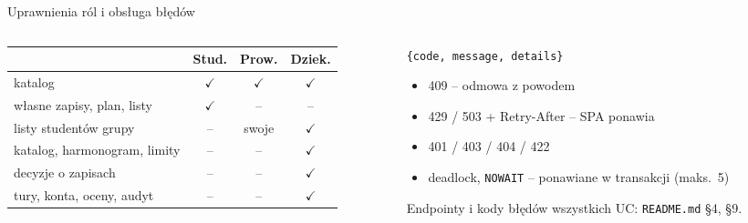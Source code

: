 \documentclass[aspectratio=169,11pt]{beamer}
\newcommand{\good}[1]{\textcolor{ok}{#1}}
\begin{document}
\begin{frame}{Uprawnienia ról i obsługa błędów}
  \begin{columns}[T]
    \begin{column}{0.5\textwidth}
      \footnotesize
      \begin{tabular}{@{}lccc@{}}
        \toprule
        & \textbf{Stud.} & \textbf{Prow.} & \textbf{Dziek.} \\
        \midrule
        katalog & \good{$\checkmark$} & \good{$\checkmark$} & \good{$\checkmark$} \\
        własne zapisy, plan, listy & \good{$\checkmark$} & -- & -- \\
        listy studentów grupy & -- & swoje & \good{$\checkmark$} \\
        katalog, harmonogram, limity & -- & -- & \good{$\checkmark$} \\
        decyzje o zapisach & -- & -- & \good{$\checkmark$} \\
        tury, konta, oceny, audyt & -- & -- & \good{$\checkmark$} \\
        \bottomrule
      \end{tabular}
    \end{column}
    \begin{column}{0.46\textwidth}
      \footnotesize
      \texttt{\{code, message, details\}}
      \begin{itemize}
        \item 409 -- odmowa z powodem
        \item 429 / 503 + Retry-After -- SPA ponawia
        \item 401 / 403 / 404 / 422
        \item deadlock, \texttt{NOWAIT} -- ponawiane w transakcji (maks.\ 5)
      \end{itemize}
      Endpointy i kody błędów wszystkich UC: \texttt{README.md} §4, §9.
    \end{column}
  \end{columns}
\end{frame}
\end{document}
